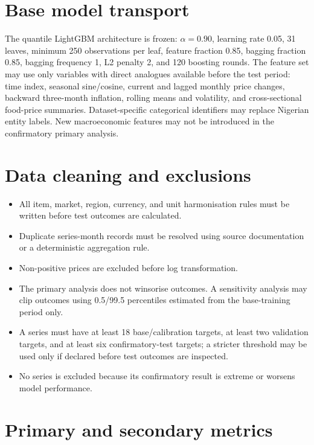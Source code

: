 \documentclass[11pt,a4paper]{article}
\begin{document}
\section{Base model transport}\label{base-model-transport}

The quantile LightGBM architecture is frozen: \(\alpha=0.90\), learning
rate 0.05, 31 leaves, minimum 250 observations per leaf, feature
fraction 0.85, bagging fraction 0.85, bagging frequency 1, L2 penalty 2,
and 120 boosting rounds. The feature set may use only variables with
direct analogues available before the test period: time index, seasonal
sine/cosine, current and lagged monthly price changes, backward
three-month inflation, rolling means and volatility, and cross-sectional
food-price summaries. Dataset-specific categorical identifiers may
replace Nigerian entity labels. New macroeconomic features may not be
introduced in the confirmatory primary analysis.

\section{Data cleaning and exclusions}\label{data-cleaning-and-exclusions}

\begin{itemize}
\item All item, market, region, currency, and unit harmonisation rules must be written before test outcomes are calculated.
\item Duplicate series-month records must be resolved using source documentation or a deterministic aggregation rule.
\item Non-positive prices are excluded before log transformation.
\item The primary analysis does not winsorise outcomes. A sensitivity analysis may clip outcomes using 0.5/99.5 percentiles estimated from the base-training period only.
\item A series must have at least 18 base/calibration targets, at least two validation targets, and at least six confirmatory-test targets; a stricter threshold may be used only if declared before test outcomes are inspected.
\item No series is excluded because its confirmatory result is extreme or worsens model performance.
\end{itemize}

\section{Primary and secondary metrics}\label{primary-and-secondary-metrics}
\end{document}

